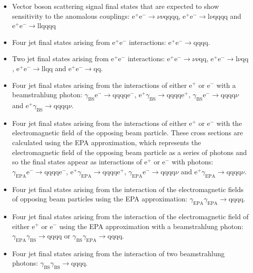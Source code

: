 \begin{itemize}
\item Vector boson scattering signal final states that are expected to show sensitivity to the anomalous couplings: $\text{e}^{+}\text{e}^{-} \rightarrow \nu\nu\text{qqqq}$, $\text{e}^{+}\text{e}^{-} \rightarrow \text{l}\nu\text{qqqq}$ and $\text{e}^{+}\text{e}^{-} \rightarrow \text{llqqqq}$
\item Four jet final states arising from $\text{e}^{+}\text{e}^{-}$ interactions: $\text{e}^{+}\text{e}^{-} \rightarrow \text{qqqq}$.
\item Two jet final states arising from $\text{e}^{+}\text{e}^{-}$ interactions: $\text{e}^{+}\text{e}^{-} \rightarrow \nu{\nu}\text{qq}$, $\text{e}^{+}\text{e}^{-} \rightarrow \text{l}\nu\text{qq}$, $\text{e}^{+}\text{e}^{-} \rightarrow \text{llqq}$ and $\text{e}^{+}\text{e}^{-} \rightarrow \text{qq}$.
\item Four jet final states arising from the interactions of either $\text{e}^{+}$ or $\text{e}^{-}$ with a beamstrahlung photon: $\gamma_{\text{BS}}\text{e}^{-} \rightarrow \text{qqqq}\text{e}^{-}$, $\text{e}^{+}\gamma_{\text{BS}} \rightarrow \text{qqqq}\text{e}^{+}$, $\gamma_{\text{BS}}\text{e}^{-} \rightarrow \text{qqqq}\nu$ and $\text{e}^{+}\gamma_{\text{BS}} \rightarrow \text{qqqq}\nu$.
\item Four jet final states arising from the interactions of either $\text{e}^{+}$ or $\text{e}^{-}$ with the electromagnetic field of the opposing beam particle.  These cross sections are calculated using the EPA approximation, which represents the electromagnetic field of the opposing beam particle as a series of photons and so the final states appear as interactions of $\text{e}^{+}$ or $\text{e}^{-}$ with photons: $\gamma_{\text{EPA}}\text{e}^{-} \rightarrow \text{qqqq}\text{e}^{-}$, $\text{e}^{+}\gamma_{\text{EPA}} \rightarrow \text{qqqq}\text{e}^{+}$, $\gamma_{\text{EPA}}\text{e}^{-} \rightarrow \text{qqqq}\nu$ and $\text{e}^{+}\gamma_{\text{EPA}} \rightarrow \text{qqqq}\nu$.
\item Four jet final states arising from the interaction of the electromagnetic fields of opposing beam particles using the EPA approximation: $\gamma_{\text{EPA}}\gamma_{\text{EPA}} \rightarrow \text{qqqq}$.
\item Four jet final states arising from the interaction of the electromagnetic field of either $\text{e}^{+}$ or $\text{e}^{-}$ using the EPA approximation with a beamstrahlung photon: $\gamma_{\text{EPA}}\gamma_{\text{BS}} \rightarrow \text{qqqq}$ or $\gamma_{\text{BS}}\gamma_{\text{EPA}} \rightarrow \text{qqqq}$.
\item Four jet final states arising from the interaction of two beamstrahlung photons: $\gamma_{\text{BS}}\gamma_{\text{BS}} \rightarrow \text{qqqq}$.
\end{itemize}

